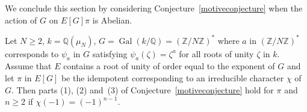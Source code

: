\documentclass{amsart}
\begin{document}
We conclude this section by considering Conjecture~\ref{motiveconjecture} when the action of $ G $
on $ E[G]\pi $ is Abelian.

\begin{prop}\label{abelprop}
Let $ N \ge 2 $, $ k = {\mathbb Q}(\mu_N) $, $ G = {\operatorname{Gal}}(k/{\mathbb Q}) = ({\mathbb Z}/N{\mathbb Z})^* $ where $ a $ in $ ({\mathbb Z}/N{\mathbb Z})^* $
corresponds to $ \psi_a $ in $ G $ satisfying $ \psi_a({\zeta}) = {\zeta}^a $ for all roots of unity $ {\zeta} $ in $ k $.
Assume that  $ E $ contains a root of unity of order equal to the exponent of $ G $
and let $ \pi $ in $ E[G] $ be the idempotent corresponding to an irreducible character $ \chi $ of $ G $.
Then parts (1), (2) and~(3) of Conjecture~\ref{motiveconjecture} hold
for $ \pi $ and $ n \ge 2 $ if $ \chi(-1) = (-1)^{n-1} $.
\end{prop}
\end{document}
